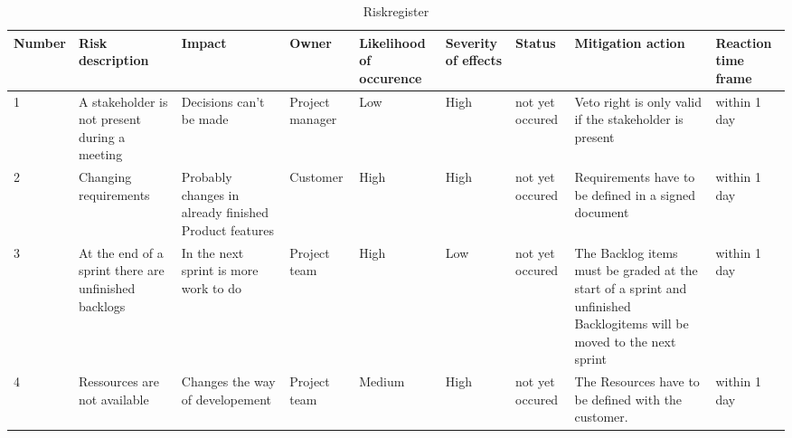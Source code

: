 \begin{table}[]
\centering
\caption{Riskregister}
\label{my-label}
\begin{tabular}{|l|l|l|l|l|l|l|l|l|}
\hline
\textbf{Number} & \textbf{Risk description}                            & \textbf{Impact}                                      & \textbf{Owner}  & \textbf{Likelihood of occurence} & \textbf{Severity of effects} & \textbf{Status} & \textbf{Mitigation action}                                                                                            & \textbf{Reaction time frame} \\ \hline
1               & A stakeholder is not present during a meeting        & Decisions can't be made                              & Project manager & Low                              & High                         & not yet occured & Veto right is only valid if the stakeholder is present                                                                & within 1 day                 \\ \hline
2               & Changing requirements                                & Probably changes in already finished Product features & Customer        & High                             & High                         & not yet occured & Requirements have to be defined in a signed document                                                                  & within 1 day                 \\ \hline
3               & At the end of a sprint there are unfinished backlogs & In the next sprint is more work to do                & Project team    & High                             & Low                          & not yet occured & The Backlog items must be graded at the start of a sprint and unfinished Backlogitems will be moved to the next sprint & within 1 day                 \\ \hline
4               & Ressources are not available                         & Changes the way of developement                      & Project team    & Medium                           & High                         & not yet occured & The Resources have to be defined with the customer.                                                                  & within 1 day                 \\ \hline
\end{tabular}
\end{table}

